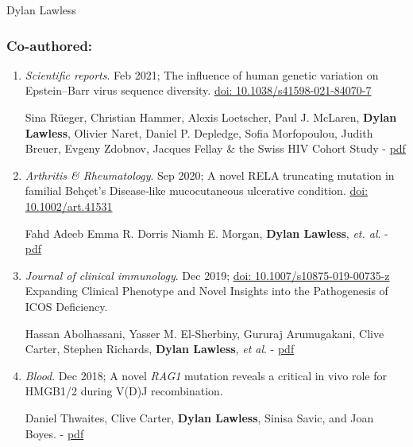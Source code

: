 \documentclass[12pt,a4paper]{article}
\begin{document}
\begin{cv}{Dylan Lawless}
\begin{enumerate}
	\setcounter{enumTemp}{\theenumi}
\end{enumerate}
 
\subsubsection*{Co-authored:}

\begin{enumerate}
    \setcounter{enumi}{\theenumTemp}

\item 
\emph{Scientific reports}. Feb 2021;
The influence of human genetic variation on Epstein–Barr virus sequence diversity. 
\href{https://www.nature.com/articles/s41598-021-84070-7}{doi: 10.1038/s41598-021-84070-7}

Sina Rüeger, Christian Hammer, Alexis Loetscher, Paul J. McLaren, \textbf{Dylan Lawless}, Olivier Naret, Daniel P. Depledge, Sofia Morfopoulou, Judith Breuer, Evgeny Zdobnov, Jacques Fellay \& the Swiss HIV Cohort Study
- \href{https://www.nature.com/articles/s41598-021-84070-7.pdf}{pdf}

\item
\emph{Arthritis \& Rheumatology}. Sep 2020;
A novel RELA truncating mutation in familial Behçet’s Disease‐like mucocutaneous ulcerative condition. 
\href{https://onlinelibrary.wiley.com/doi/10.1002/art.41531}{doi: 10.1002/art.41531}

Fahd Adeeb Emma R. Dorris Niamh E. Morgan, \textbf{Dylan Lawless}, \emph{et. al}.
- \href{https://onlinelibrary.wiley.com/doi/epdf/10.1002/art.41531}{pdf}

\item  \emph{Journal of clinical immunology}. Dec 2019; 
\href{https://link.springer.com/10.1007/s10875-019-00735-z}{doi: 10.1007/s10875-019-00735-z}
Expanding Clinical Phenotype and Novel Insights into the Pathogenesis of ICOS Deficiency. 

Hassan Abolhassani, Yasser M. El-Sherbiny, Gururaj Arumugakani, Clive Carter, Stephen Richards, \textbf{Dylan Lawless},  \textit{et al}.
- \href{https://dylanlawless.github.io/resume/pdf/2020JOCIAbolhassaniExpandingClinicalPhenotypeAndNovelInsightsintothe\%20PathogenesisofICOSDeficiency.pdf}{pdf}

\item  \emph{Blood}. Dec 2018; A novel \textit{RAG1}  mutation reveals a critical in vivo role for HMGB1/2 during V(D)J recombination.  

Daniel Thwaites, Clive Carter, \textbf{Dylan Lawless}, Sinisa Savic, and Joan Boyes.
- \href{https://dylanlawless.github.io/resume/pdf/2018BloodThwaites_A\%20novel\%20RAG1\%20mutation\%20reveals\%20a\%20critical\%20in\%20vivo\%20role\%20for\%20HMGB1_2\%20during\%20V(D)J\%20recombination.pdf}{pdf}


\end{enumerate}
\end{cv}
\end{document}

